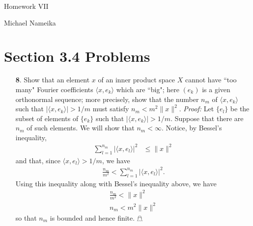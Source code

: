 \documentclass{article}
\begin{document}
\begin{center}
    {\Huge Homework VII}
    \vspace{0.5cm}
    
    {\Large Michael Nameika}
\end{center}


\section*{Section 3.4 Problems}
\begin{itemize}
    \item[\textbf{8}.] Show that an element $x$ of an inner product space $X$ cannot have ``too many" Fourier coefficients $\langle x, e_k \rangle$ which are ``big"; here $(e_k)$ is a given orthonormal sequence; more precisely, show that the number $n_m$ of $\langle x, e_k\rangle$ such that $|\langle x, e_k \rangle| > 1/m$ must satisfy $n_m < m^2 \|x\|^2$.
    \newline\newline
    \textit{Proof:} Let $\{e_l\}$ be the subset of elements of $\{e_k\}$ such that $|\langle x, e_k \rangle| > 1/m$. Suppose that there are $n_m$ of such elements. We will show that $n_m < \infty$. Notice, by Bessel's inequality,
    \begin{align*}
        \sum_{l = 1}^{n_m} |\langle x, e_l \rangle|^2 &\leq \|x\|^2
    \end{align*}
    and that, since $\langle x, e_l \rangle > 1/m$, we have
    \begin{align*}
        \frac{n_m}{m^2} < \sum_{l = 1}^{n_m} |\langle x, e_l \rangle |^2.
    \end{align*}
    Using this inequality along with Bessel's inequality above, we have
    \begin{align*}
        \frac{n_m}{m^2} < \|x\|^2\\
        n_m < m^2\|x\|^2
    \end{align*}
    so that $n_m$ is bounded and hence finite. \hfill $\mathghost$


\end{itemize}
\end{document}
